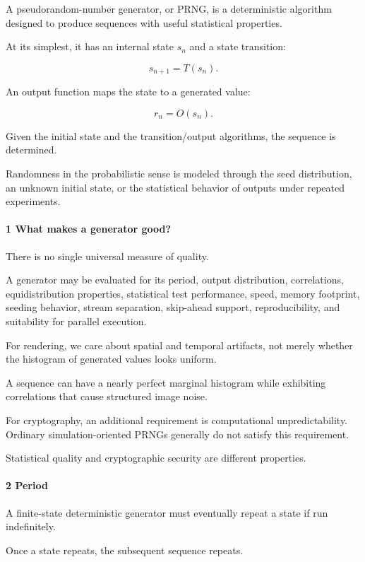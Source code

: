 A pseudorandom-number generator, or PRNG, is a deterministic algorithm designed to produce sequences with useful statistical properties.

At its simplest, it has an internal state \(s_n\) and a state transition:

\[
 \boxed{s_{n+1}=T(s_n)}.
\]

An output function maps the state to a generated value:

\[
 \boxed{r_n=O(s_n)}.
\]

Given the initial state and the transition/output algorithms, the sequence is determined.

Randomness in the probabilistic sense is modeled through the seed distribution, an unknown initial state, or the statistical behavior of outputs under repeated experiments.

\paragraph{1 What makes a generator good?}\label{what-makes-a-generator-good}

There is no single universal measure of quality.

A generator may be evaluated for its period, output distribution, correlations, equidistribution properties, statistical test performance, speed, memory footprint, seeding behavior, stream separation, skip-ahead support, reproducibility, and suitability for parallel execution.

For rendering, we care about spatial and temporal artifacts, not merely whether the histogram of generated values looks uniform.

A sequence can have a nearly perfect marginal histogram while exhibiting correlations that cause structured image noise.

For cryptography, an additional requirement is computational unpredictability. Ordinary simulation-oriented PRNGs generally do not satisfy this requirement.

Statistical quality and cryptographic security are different properties.

\paragraph{2 Period}\label{period}

A finite-state deterministic generator must eventually repeat a state if run indefinitely.

Once a state repeats, the subsequent sequence repeats.

